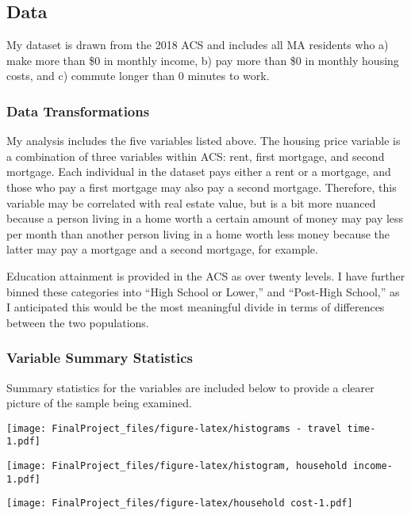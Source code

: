 \documentclass[
]{article}
\begin{document}
\hypertarget{data}{%
\subsection{Data}\label{data}}

My dataset is drawn from the 2018 ACS and includes all MA residents who
a) make more than \$0 in monthly income, b) pay more than \$0 in monthly
housing costs, and c) commute longer than 0 minutes to work.

\hypertarget{data-transformations}{%
\subsubsection{Data Transformations}\label{data-transformations}}

My analysis includes the five variables listed above. The housing price
variable is a combination of three variables within ACS: rent, first
mortgage, and second mortgage. Each individual in the dataset pays
either a rent or a mortgage, and those who pay a first mortgage may also
pay a second mortgage. Therefore, this variable may be correlated with
real estate value, but is a bit more nuanced because a person living in
a home worth a certain amount of money may pay less per month than
another person living in a home worth less money because the latter may
pay a mortgage and a second mortgage, for example.

Education attainment is provided in the ACS as over twenty levels. I
have further binned these categories into ``High School or Lower,'' and
``Post-High School,'' as I anticipated this would be the most meaningful
divide in terms of differences between the two populations.

\hypertarget{variable-summary-statistics}{%
\subsubsection{Variable Summary
Statistics}\label{variable-summary-statistics}}

Summary statistics for the variables are included below to provide a
clearer picture of the sample being examined.

\texttt{[image: FinalProject\_files/figure-latex/histograms - travel time-1.pdf]}

\texttt{[image: FinalProject\_files/figure-latex/histogram, household income-1.pdf]}

\texttt{[image: FinalProject\_files/figure-latex/household cost-1.pdf]}
\end{document}
